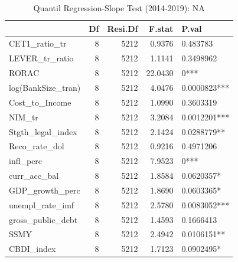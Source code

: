 \begin{table}[ht]
\centering
\caption{Quantil Regression-Slope Test (2014-2019): NA} 
\begingroup\small
\begin{tabular}{lrrrl}
  \toprule
 & Df & Resi.Df & F.stat & P.val \\ 
  \midrule
CET1\_ratio\_tr & 8 & 5212 & 0.9376 & 0.483783 \\ 
  LEVER\_tr\_ratio & 8 & 5212 & 1.1141 & 0.3498962 \\ 
  RORAC & 8 & 5212 & 22.0430 & 0*** \\ 
  log(BankSize\_tran) & 8 & 5212 & 4.0476 & 0.0000823*** \\ 
  Cost\_to\_Income & 8 & 5212 & 1.0990 & 0.3603319 \\ 
  NIM\_tr & 8 & 5212 & 3.2084 & 0.0012201*** \\ 
  Stgth\_legal\_index & 8 & 5212 & 2.1424 & 0.0288779** \\ 
  Reco\_rate\_dol & 8 & 5212 & 0.9216 & 0.4971206 \\ 
  infl\_perc & 8 & 5212 & 7.9523 & 0*** \\ 
  curr\_acc\_bal & 8 & 5212 & 1.8584 & 0.0620357* \\ 
  GDP\_growth\_perc & 8 & 5212 & 1.8690 & 0.0603365* \\ 
  unempl\_rate\_imf & 8 & 5212 & 2.5780 & 0.0083052*** \\ 
  gross\_public\_debt & 8 & 5212 & 1.4593 & 0.1666413 \\ 
  SSMY & 8 & 5212 & 2.4942 & 0.0106151** \\ 
  CBDI\_index & 8 & 5212 & 1.7123 & 0.0902495* \\ 
   \bottomrule
\end{tabular}
\endgroup
\end{table}
